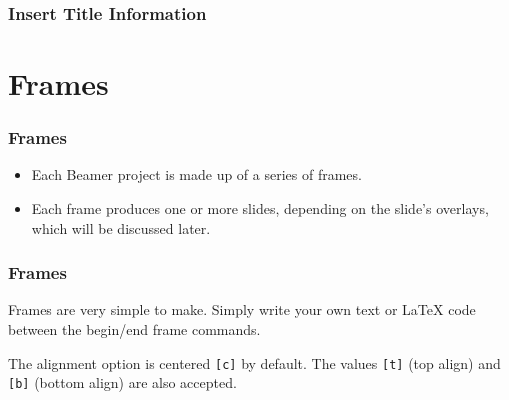 \documentclass[aspectratio=169,utf8]{ctexbeamer}
\begin{document}
\begin{frame}
  \frametitle{Insert Title Information}

    
\end{frame}

\section{Frames}
\begin{frame}
  \frametitle{Frames}

  \begin{itemize}
  \item Each Beamer project is made up of a series of frames.
  \item Each frame produces one or more slides, depending on the slide’s overlays, which will be discussed later.
  \end{itemize}

      
\end{frame}


\begin{frame}
  \frametitle{Frames}

  Frames are very simple to make. Simply write your own text or \LaTeX{} code between the begin/end frame commands.

  The alignment option is centered \lstinline{[c]} by default. The values \lstinline{[t]} (top align) and \lstinline{[b]} (bottom align) are also accepted.


\end{frame}
\end{document}
